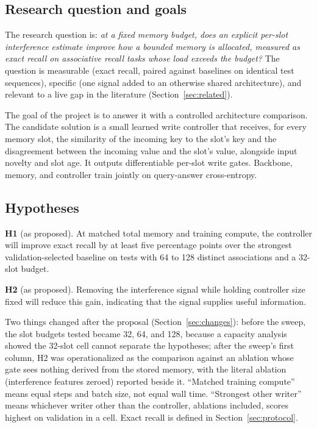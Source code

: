 \documentclass[conference]{IEEEtran}
\begin{document}
\subsection{Research question and goals}

The research question is: \emph{at a fixed memory budget, does an explicit
per-slot interference estimate improve how a bounded memory is allocated,
measured as exact recall on associative recall tasks whose load exceeds the
budget?} The question is measurable (exact recall, paired against baselines on
identical test sequences), specific (one signal added to an otherwise shared
architecture), and relevant to a live gap in the literature
(Section~\ref{sec:related}).

The goal of the project is to answer it with a controlled architecture
comparison. The candidate solution is a small learned write controller that
receives, for every memory slot, the similarity of the incoming key to the slot's
key and the disagreement between the incoming value and the slot's value,
alongside input novelty and slot age. It outputs differentiable per-slot write
gates. Backbone, memory, and controller train jointly on query-answer
cross-entropy.

\subsection{Hypotheses}

\textbf{H1} (as proposed). At matched total memory and training compute, the
controller will improve exact recall by at least five percentage points over
the strongest validation-selected baseline on tests with 64 to 128 distinct
associations and a 32-slot budget.

\textbf{H2} (as proposed). Removing the interference signal while holding
controller size fixed will reduce this gain, indicating that the signal
supplies useful information.

Two things changed after the proposal (Section~\ref{sec:changes}): before
the sweep, the slot budgets tested became 32, 64, and 128, because a capacity
analysis showed the 32-slot cell cannot separate the hypotheses; after the
sweep's first column, H2 was operationalized as the comparison against an
ablation whose gate sees nothing derived from the stored memory, with the
literal ablation (interference features zeroed) reported beside it. ``Matched
training compute'' means equal steps and batch size, not equal wall time.
``Strongest other writer'' means whichever writer other than the controller,
ablations included, scores highest on validation in a cell. Exact recall is
defined in Section~\ref{sec:protocol}.
\end{document}

